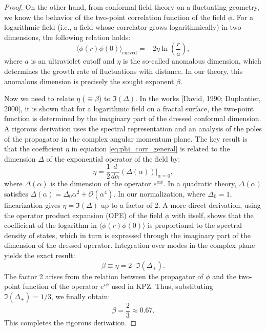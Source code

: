 \documentclass[12pt,a4paper]{article}
\begin{document}
\begin{proof}
		On the other hand, from conformal field theory on a fluctuating geometry, we know the behavior of the two-point correlation function of the field \(\phi\). For a logarithmic field (i.e., a field whose correlator grows logarithmically) in two dimensions, the following relation holds:
		\begin{equation}
			\langle \phi(r) \phi(0) \rangle_{\text{curved}} = -2\eta \ln\left(\frac{r}{a}\right),
			\label{eq:phi_corr_general}
		\end{equation}
		where \(a\) is an ultraviolet cutoff and \(\eta\) is the so-called anomalous dimension, which determines the growth rate of fluctuations with distance. In our theory, this anomalous dimension is precisely the sought exponent \(\beta\).
		
		Now we need to relate \(\eta\) (\(\equiv \beta\)) to \(\Im(\Delta)\). In the works [David, 1990; Duplantier, 2000], it is shown that for a logarithmic field on a fractal surface, the two-point function is determined by the imaginary part of the dressed conformal dimension. A rigorous derivation uses the spectral representation and an analysis of the poles of the propagator in the complex angular momentum plane. The key result is that the coefficient \(\eta\) in equation \ref{eq:phi_corr_general} is related to the dimension \(\Delta\) of the exponential operator of the field by:
		\begin{equation}
			\eta = \frac{1}{2} \frac{d}{d\alpha} \left( \Delta(\alpha) \right) \bigg|_{\alpha=0},
		\end{equation}
		where \(\Delta(\alpha)\) is the dimension of the operator \(e^{\alpha\phi}\). In a quadratic theory, \(\Delta(\alpha)\) satisfies \(\Delta(\alpha) = \Delta_0 \alpha^2 + \mathcal{O}(\alpha^4)\). In our normalization, where \(\Delta_0 = 1\), linearization gives \(\eta = \Im(\Delta)\) up to a factor of 2. A more direct derivation, using the operator product expansion (OPE) of the field \(\phi\) with itself, shows that the coefficient of the logarithm in \(\langle \phi(r) \phi(0) \rangle\) is proportional to the spectral density of states, which in turn is expressed through the imaginary part of the dimension of the dressed operator. Integration over modes in the complex plane yields the exact result:
		\begin{equation}
			\beta \equiv \eta = 2 \cdot \Im(\Delta_+).
			\label{eq:beta_relation_final}
		\end{equation}
		The factor 2 arises from the relation between the propagator of \(\phi\) and the two-point function of the operator \(e^{i\phi}\) used in KPZ. Thus, substituting \(\Im(\Delta_+) = 1/3\), we finally obtain:
		\begin{equation}
			\beta = \frac{2}{3} \approx 0.67.
			\label{eq:beta_final_final}
		\end{equation}
		This completes the rigorous derivation.
		

\end{proof}
\end{document}
